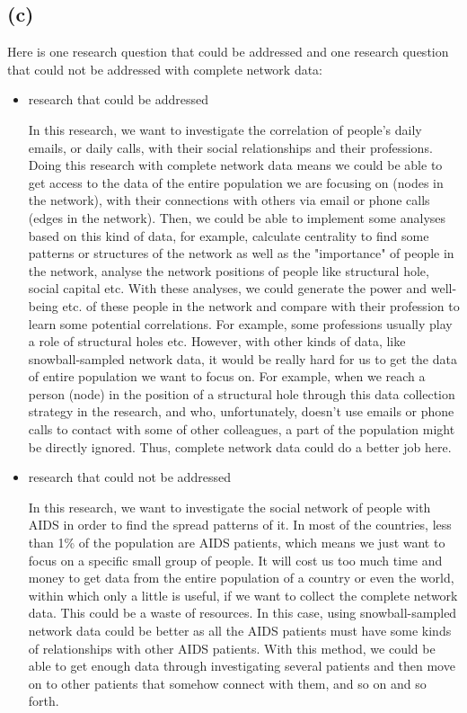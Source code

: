 \documentclass[11pt]{article}
\begin{document}
\subsection*{(c)}
\par Here is one research question that could be addressed and one research question that could not be addressed with complete network data:
    \begin{itemize}
        \item research that could be addressed
        
            In this research, we want to investigate the correlation of people's daily emails, or daily calls, with their social relationships and their professions. Doing this research with complete network data means we could be able to get access to the data of the entire population we are focusing on (nodes in the network), with their connections with others via email or phone calls (edges in the network). Then, we could be able to implement some analyses based on this kind of data, for example, calculate centrality to find some patterns or structures of the network as well as the "importance" of people in the network, analyse the network positions of people like structural hole, social capital etc. With these analyses, we could generate the power and well-being etc. of these people in the network and compare with their profession to learn some potential correlations. For example, some professions usually play a role of structural holes etc. However, with other kinds of data, like snowball-sampled network data, it would be really hard for us to get the data of entire population we want to focus on. For example, when we reach a person (node) in the position of a structural hole through this data collection strategy in the research, and who, unfortunately, doesn't use emails or phone calls to contact with some of other colleagues, a part of the population might be directly ignored. Thus, complete network data could do a better job here.
            \\
        \item research that could not be addressed
        
            In this research, we want to investigate the social network of people with AIDS in order to find the spread patterns of it. In most of the countries, less than 1\% of the population are AIDS patients, which means we just want to focus on a specific small group of people. It will cost us too much time and money to get data from the entire population of a country or even the world, within which only a little is useful, if we want to collect the complete network data. This could be a waste of resources. In this case, using snowball-sampled network data could be better as all the AIDS patients must have some kinds of relationships with other AIDS patients. With this method, we could be able to get enough data through investigating several patients and then move on to other patients that somehow connect with them, and so on and so forth.
    \end{itemize}
    
\printbibliography
\end{document}
